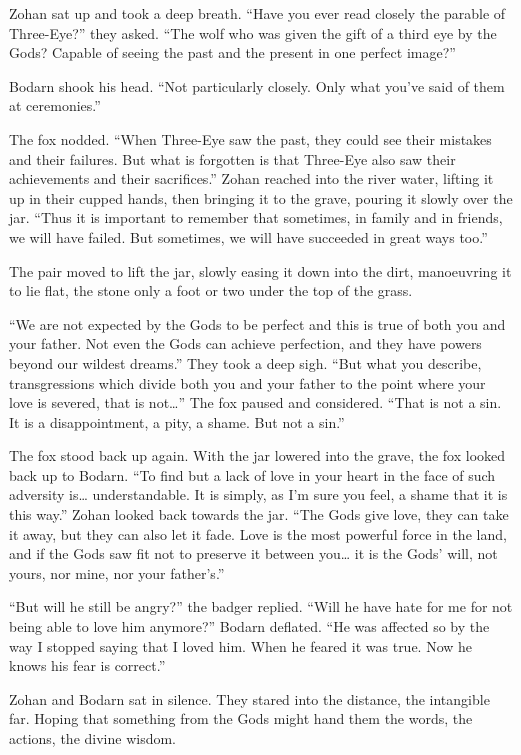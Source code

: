 Zohan sat up and took a deep breath. ``Have you ever read closely the parable of Three-Eye?'' they asked. ``The wolf who was given the gift of a third eye by the Gods? Capable of seeing the past and the present in one perfect image?''

Bodarn shook his head. ``Not particularly closely. Only what you've said of them at ceremonies.''

The fox nodded. ``When Three-Eye saw the past, they could see their mistakes and their failures. But what is forgotten is that Three-Eye also saw their achievements and their sacrifices.'' Zohan reached into the river water, lifting it up in their cupped hands, then bringing it to the grave, pouring it slowly over the jar. ``Thus it is important to remember that sometimes, in family and in friends, we will have failed. But sometimes, we will have succeeded in great ways too.''

The pair moved to lift the jar, slowly easing it down into the dirt, manoeuvring it to lie flat, the stone only a foot or two under the top of the grass.

``We are not expected by the Gods to be perfect and this is true of both you and your father. Not even the Gods can achieve perfection, and they have powers beyond our wildest dreams.'' They took a deep sigh. ``But what you describe, transgressions which divide both you and your father to the point where your love is severed, that is not\ldots'' The fox paused and considered. ``That is not a sin. It is a disappointment, a pity, a shame. But not a sin.''

The fox stood back up again. With the jar lowered into the grave, the fox looked back up to Bodarn. ``To find but a lack of love in your heart in the face of such adversity is\ldots{} understandable. It is simply, as I'm sure you feel, a shame that it is this way.'' Zohan looked back towards the jar. ``The Gods give love, they can take it away, but they can also let it fade. Love is the most powerful force in the land, and if the Gods saw fit not to preserve it between you\ldots{} it is the Gods' will, not yours, nor mine, nor your father's.''

``But will he still be angry?'' the badger replied. ``Will he have hate for me for not being able to love him anymore?'' Bodarn deflated. ``He was affected so by the way I stopped saying that I loved him. When he feared it was true. Now he knows his fear is correct.''

Zohan and Bodarn sat in silence. They stared into the distance, the intangible far. Hoping that something from the Gods might hand them the words, the actions, the divine wisdom.

